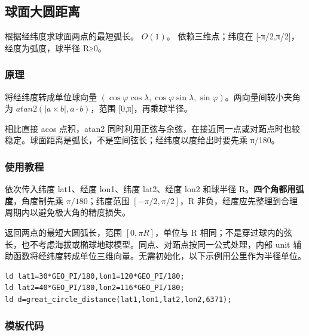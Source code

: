 \subsection{球面大圆距离}
\label{geo:sphere}
\AlgorithmInfo
    {根据经纬度求球面两点的最短弧长。}
    {$O(1)$。}
    {依赖三维点；纬度在 [-π/2,π/2]，经度为弧度，球半径 R≥0。}
\subsubsection*{原理}

将经纬度转成单位球向量 $(\cos\varphi\cos\lambda,\cos\varphi\sin\lambda,\sin\varphi)$。两向量间较小夹角为 $atan2(|a\times b|,a\cdot b)$，范围 [0,π]，再乘球半径。

相比直接 acos 点积，atan2 同时利用正弦与余弦，在接近同一点或对跖点时也较稳定。球面距离是弧长，不是空间弦长；经纬度以度给出时要先乘 π/180。

\subsubsection*{使用教程}
 依次传入纬度 lat1、经度 lon1、纬度 lat2、经度 lon2 和球半径 R。\textbf{四个角都用弧度}，角度制先乘 $\pi/180$；纬度范围 $[-\pi/2,\pi/2]$，R 非负，经度应先整理到合理周期内以避免极大角的精度损失。

返回两点的最短大圆弧长，范围 $[0,\pi R]$，单位与 R 相同；不是穿过球内的弦长，也不考虑海拔或椭球地球模型。同点、对跖点按同一公式处理，内部 unit 辅助函数将经纬度转成单位三维向量。无需初始化，以下示例用公里作为半径单位。
\begin{lstlisting}[style=mtycpp,numbers=none]
ld lat1=30*GEO_PI/180,lon1=120*GEO_PI/180;
ld lat2=40*GEO_PI/180,lon2=116*GEO_PI/180;
ld d=great_circle_distance(lat1,lon1,lat2,lon2,6371);
\end{lstlisting}
\subsubsection*{模板代码}
